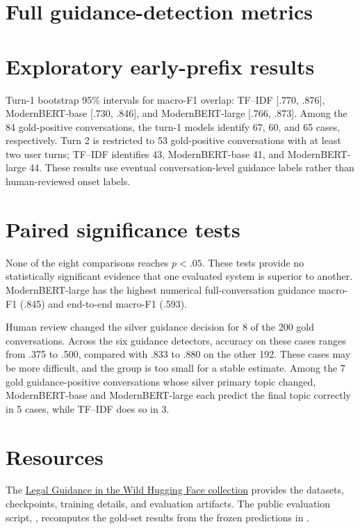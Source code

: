 \documentclass[11pt]{article}
\begin{document}
\section{Full guidance-detection metrics}



\section{Exploratory early-prefix results}



Turn-1 bootstrap 95\% intervals for macro-F1 overlap: TF--IDF [.770, .876], ModernBERT-base [.730, .846], and ModernBERT-large [.766, .873]. Among the 84 gold-positive conversations, the turn-1 models identify 67, 60, and 65 cases, respectively. Turn 2 is restricted to 53 gold-positive conversations with at least two user turns; TF--IDF identifies 43, ModernBERT-base 41, and ModernBERT-large 44. These results use eventual conversation-level guidance labels rather than human-reviewed onset labels.

\section{Paired significance tests}



None of the eight comparisons reaches $p<.05$. These tests provide no statistically significant evidence that one evaluated system is superior to another. ModernBERT-large has the highest numerical full-conversation guidance macro-F1 (.845) and end-to-end macro-F1 (.593).

Human review changed the silver guidance decision for 8 of the 200 gold conversations. Across the six guidance detectors, accuracy on these cases ranges from .375 to .500, compared with .833 to .880 on the other 192. These cases may be more difficult, and the group is too small for a stable estimate. Among the 7 gold guidance-positive conversations whose silver primary topic changed, ModernBERT-base and ModernBERT-large each predict the final topic correctly in 5 cases, while TF--IDF does so in 3.

\section{Resources}

The \href{https://huggingface.co/collections/AmirMohseni/legal-guidance-in-the-wild}{Legal Guidance in the Wild Hugging Face collection} provides the datasets, checkpoints, training details, and evaluation artifacts. The public evaluation script, , recomputes the gold-set results from the frozen predictions in .
\end{document}
